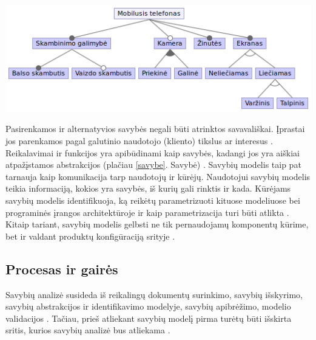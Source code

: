 \documentclass{VUMIFPSbakalaurinis}
\begin{document}
\begin{center}
    \includegraphics[scale=0.6]{img/mobile}
    \label{img:fm_example}
\end{center}

Pasirenkamos ir alternatyvios savybės negali būti atrinktos savavališkai. Įprastai jos parenkamos pagal galutinio naudotojo (kliento) tikslus ar interesus \cite{Kang1990}. Reikalavimai ir funkcijos yra apibūdinami kaip savybės, kadangi jos yra aiškiai atpažįstamos abstrakcijos (plačiau \ref{savybe}. Savybė) \cite{Lee2015}. Savybių modelis taip pat tarnauja kaip komunikacija tarp naudotojų ir kūrėjų. Naudotojui savybių modelis teikia informaciją, kokios yra savybės, iš kurių gali rinktis ir kada. Kūrėjams savybių modelis identifikuoja, ką reikėtų parametrizuoti kituose modeliuose bei programinės įrangos architektūroje ir kaip parametrizacija turi būti atlikta \cite{Kang1990}. Kitaip tariant, savybių modelis gelbsti ne tik pernaudojamų komponentų kūrime, bet ir valdant produktų konfigūraciją srityje \cite{Lee2015}.



\subsection{Procesas ir gairės} \label{procesas}

Savybių analizė susideda iš reikalingų dokumentų surinkimo, savybių išskyrimo, savybių abstrakcijos ir identifikavimo modelyje, savybių apibrėžimo, modelio validacijos \cite{Kang1990}. Tačiau, prieš atliekant savybių modelį pirma turėtų būti išskirta sritis, kurios savybių analizė bus atliekama \cite{Lee2015}.
\end{document}
